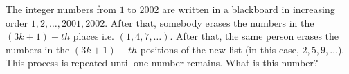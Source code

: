 The integer numbers from $1$ to $2002$ are written in a blackboard in increasing order $1,2,\ldots, 2001,2002$. After that, somebody erases the numbers in the $ (3k+1)-th$ places i.e. $(1,4,7,\dots)$. After that, the same person erases the numbers in the $(3k+1)-th$ positions of the new list (in this case, $2,5,9,\ldots$). This process is repeated until one number remains. What is this number?